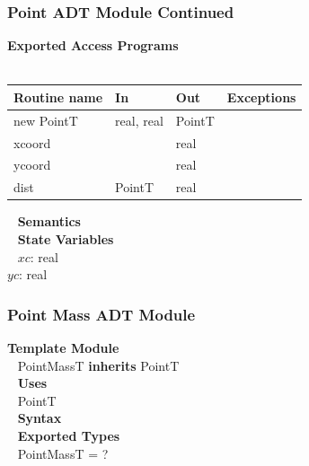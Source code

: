 \documentclass[t,12pt,numbers,fleqn]{beamer}
\begin{document}
\begin{frame}
\frametitle{Point ADT Module Continued}

\textbf{Exported Access Programs}\\
~\newline
\begin{tabular}{| l | l | l | l |}
\hline
\textbf{Routine name} & \textbf{In} & \textbf{Out} & \textbf{Exceptions}\\
\hline
new PointT & real, real & PointT & ~\\
\hline
xcoord & ~ & real & ~\\
\hline
ycoord & ~ & real & ~\\
\hline
dist & PointT & real & ~\\
\hline
\end{tabular}

~\newline
\textbf{Semantics}\\
~\newline
\textbf{State Variables}\\
~\newline
$xc$: real\\
$yc$: real

\end{frame}


\begin{frame}
\frametitle{Point Mass ADT Module}

\textbf{Template Module}\\
~\newline
PointMassT \textbf{inherits} PointT\\
~\newline
\textbf{Uses}\\
~\newline
PointT\\
~\newline
\textbf{Syntax}\\
~\newline
\textbf{Exported Types}\\
~\newline
PointMassT = ?\\

\end{frame}

\end{document}
